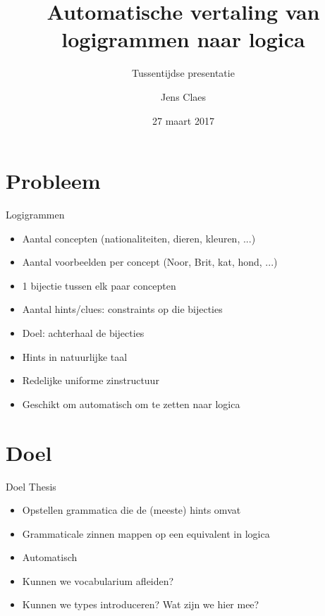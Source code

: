 \documentclass[notes, dvipsnames]{beamer}
\title{Automatische vertaling van logigrammen naar logica}
\subtitle{Tussentijdse presentatie}
\author{Jens Claes}
\date{27 maart 2017}
\newcommand{\seperation}{
	\vspace{1em}
	\ppause
}
\newcommand{\hitem}{
	\ppause
	\item
}
\newcommand{\ppause}{\onslide<+>}
\begin{document}
	\frame{\titlepage}
	\section{Probleem}
	\begin{frame}{Logigrammen}
		\begin{itemize}
      \hitem Aantal concepten (nationaliteiten, dieren, kleuren, ...)
      \item Aantal voorbeelden per concept (Noor, Brit, kat, hond, ...)
      \item 1 bijectie tussen elk paar concepten
      \item Aantal hints/clues: constraints op die bijecties
			\hitem Doel: achterhaal de bijecties
			
			\seperation
			
			\item Hints in natuurlijke taal
      \item Redelijke uniforme zinstructuur
			
			\seperation

      \item Geschikt om automatisch om te zetten naar logica
		\end{itemize}
	\end{frame}
	
	\section{Doel}
	\begin{frame}{Doel Thesis}
		\begin{itemize}
			\hitem Opstellen grammatica die de (meeste) hints omvat
			\item Grammaticale zinnen mappen op een equivalent in logica
      \item Automatisch
			
			\seperation
      \item Kunnen we vocabularium afleiden?
      \item Kunnen we types introduceren? Wat zijn we hier mee?
		\end{itemize}
	\end{frame}
\end{document}
